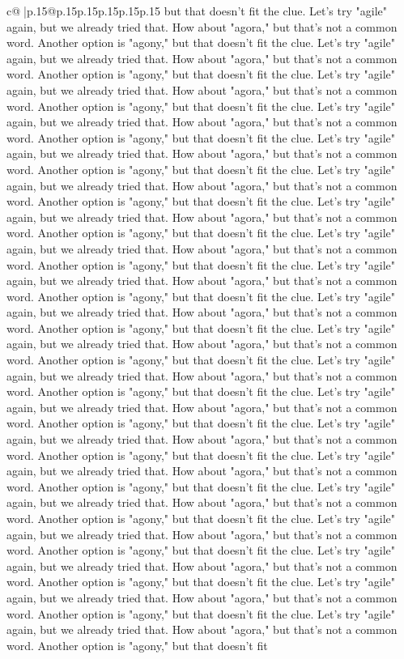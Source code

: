 \documentclass{article}
\begin{document}
{\begin{supertabular}{c@{$\;$}|p{.15\linewidth}@{}p{.15\linewidth}p{.15\linewidth}p{.15\linewidth}p{.15\linewidth}p{.15\linewidth}}
{{{but that doesn't fit the clue. Let's try "agile" again, but we already tried that. How about "agora," but that's not a common word. Another option is "agony," but that doesn't fit the clue. Let's try "agile" again, but we already tried that. How about "agora," but that's not a common word. Another option is "agony," but that doesn't fit the clue. Let's try "agile" again, but we already tried that. How about "agora," but that's not a common word. Another option is "agony," but that doesn't fit the clue. Let's try "agile" again, but we already tried that. How about "agora," but that's not a common word. Another option is "agony," but that doesn't fit the clue. Let's try "agile" again, but we already tried that. How about "agora," but that's not a common word. Another option is "agony," but that doesn't fit the clue. Let's try "agile" again, but we already tried that. How about "agora," but that's not a common word. Another option is "agony," but that doesn't fit the clue. Let's try "agile" again, but we already tried that. How about "agora," but that's not a common word. Another option is "agony," but that doesn't fit the clue. Let's try "agile" again, but we already tried that. How about "agora," but that's not a common word. Another option is "agony," but that doesn't fit the clue. Let's try "agile" again, but we already tried that. How about "agora," but that's not a common word. Another option is "agony," but that doesn't fit the clue. Let's try "agile" again, but we already tried that. How about "agora," but that's not a common word. Another option is "agony," but that doesn't fit the clue. Let's try "agile" again, but we already tried that. How about "agora," but that's not a common word. Another option is "agony," but that doesn't fit the clue. Let's try "agile" again, but we already tried that. How about "agora," but that's not a common word. Another option is "agony," but that doesn't fit the clue. Let's try "agile" again, but we already tried that. How about "agora," but that's not a common word. Another option is "agony," but that doesn't fit the clue. Let's try "agile" again, but we already tried that. How about "agora," but that's not a common word. Another option is "agony," but that doesn't fit the clue. Let's try "agile" again, but we already tried that. How about "agora," but that's not a common word. Another option is "agony," but that doesn't fit the clue. Let's try "agile" again, but we already tried that. How about "agora," but that's not a common word. Another option is "agony," but that doesn't fit the clue. Let's try "agile" again, but we already tried that. How about "agora," but that's not a common word. Another option is "agony," but that doesn't fit the clue. Let's try "agile" again, but we already tried that. How about "agora," but that's not a common word. Another option is "agony," but that doesn't fit the clue. Let's try "agile" again, but we already tried that. How about "agora," but that's not a common word. Another option is "agony," but that doesn't fit the clue. Let's try "agile" again, but we already tried that. How about "agora," but that's not a common word. Another option is "agony," but that doesn't fit }}}
\end{supertabular}}
\end{document}
